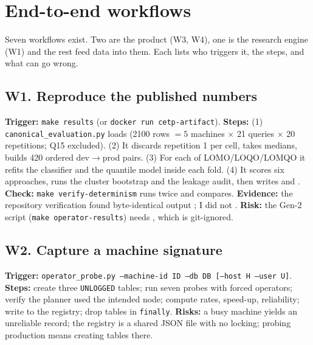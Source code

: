 \chapter{End-to-end workflows}\label{ch:workflows}

Seven workflows exist. Two are the product (W3, W4), one is the research engine (W1) and the rest feed
data into them. Each lists who triggers it, the steps, and what can go wrong.

\section{W1. Reproduce the published numbers}
\textbf{Trigger:} \texttt{make results} (or \texttt{docker run cetp-artifact}). \textbf{Steps:}
(1) \texttt{canonical\_evaluation.py} loads 
(2100 rows $=5$ machines $\times$ 21 queries $\times$ 20 repetitions; Q15 excluded). (2) It discards repetition 1 per cell, takes
medians, builds 420 ordered dev$\to$prod pairs. (3) For each of LOMO/LOQO/LOMQO it refits the classifier and the quantile model
inside each fold. (4) It scores six approaches, runs the cluster bootstrap and the leakage audit, then writes
 and . \textbf{Check:} \texttt{make verify-determinism}
runs twice and compares. \textbf{Evidence:} the repository verification found byte-identical output \evPACK; I did not \evUNK.
\textbf{Risk:} the Gen-2 script (\texttt{make operator-results}) needs , which is git-ignored.

\section{W2. Capture a machine signature}
\textbf{Trigger:} \texttt{operator\_probe.py --machine-id ID --db DB [--host H --user U]}. \textbf{Steps:} create three \texttt{UNLOGGED}
tables; run seven probes with forced operators; verify the planner used the intended node; compute rates, speed-up, reliability;
write to the registry; drop tables in \texttt{finally}. \textbf{Risks:} a busy machine yields an unreliable record; the registry is a shared
JSON file with no locking; probing production means creating tables there.

